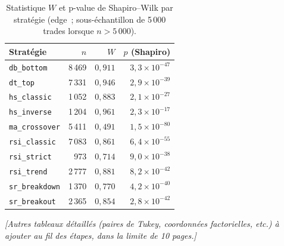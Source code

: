 \begin{table}[H]
\centering
\caption{Statistique \(W\) et p-value de Shapiro--Wilk par stratégie
(edge~; sous-échantillon de 5\,000 trades lorsque \(n > 5\,000\)).}
\label{tab:ann-shapiro}
\small
\begin{tabular}{@{}lrrr@{}}
\toprule
Stratégie & $n$ & $W$ & $p$ (Shapiro) \\
\midrule
\texttt{db\_bottom}    & 8\,469 & $0{,}911$ & $3{,}3\times10^{-47}$ \\
\texttt{dt\_top}       & 7\,331 & $0{,}946$ & $2{,}9\times10^{-39}$ \\
\texttt{hs\_classic}   & 1\,052 & $0{,}883$ & $2{,}1\times10^{-27}$ \\
\texttt{hs\_inverse}   & 1\,204 & $0{,}961$ & $2{,}3\times10^{-17}$ \\
\texttt{ma\_crossover} & 5\,411 & $0{,}491$ & $1{,}5\times10^{-80}$ \\
\texttt{rsi\_classic}  & 7\,083 & $0{,}861$ & $6{,}4\times10^{-55}$ \\
\texttt{rsi\_strict}   &   973  & $0{,}714$ & $9{,}0\times10^{-38}$ \\
\texttt{rsi\_trend}    & 2\,777 & $0{,}881$ & $8{,}2\times10^{-42}$ \\
\texttt{sr\_breakdown} & 1\,370 & $0{,}770$ & $4{,}2\times10^{-40}$ \\
\texttt{sr\_breakout}  & 2\,365 & $0{,}854$ & $2{,}8\times10^{-42}$ \\
\bottomrule
\end{tabular}
\end{table}

\emph{[Autres tableaux détaillés (paires de Tukey, coordonnées
factorielles, etc.) à ajouter au fil des étapes, dans la limite de 10
pages.]}
